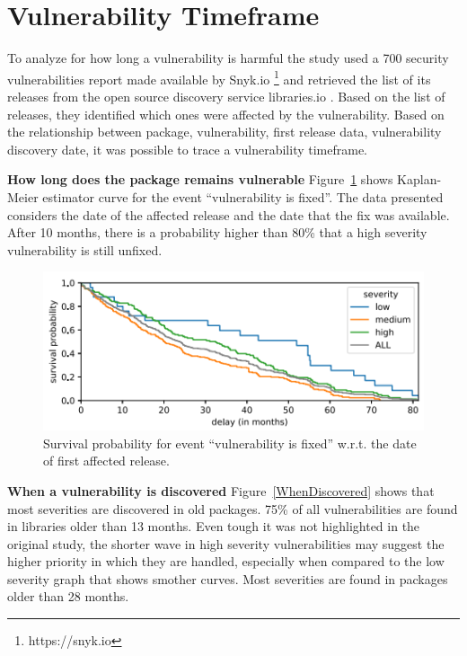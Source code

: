 \documentclass[pdf,bookmarks,colorlinks=true]{IEEEtran}
\begin{document}
\section{Vulnerability Timeframe}
\label{sec:VulnerabilityTimeFrame}


To analyze for how long a vulnerability is harmful the study \cite{Decan2018} used a 700 security vulnerabilities report made available by Snyk.io \footnote{https://snyk.io} and retrieved the list of its releases from the open source discovery service libraries.io \cite{Nesbitt2017}. Based on the list of releases, they identified which ones were affected by the vulnerability.
Based on the relationship between package, vulnerability, first release data, vulnerability discovery date, it was possible to trace a vulnerability timeframe.

\textbf{How long does the package remains vulnerable}
Figure~\ref{RemainsVulnerable} shows Kaplan-Meier estimator  curve \cite{Kaplan1958} for the event “vulnerability is fixed”. The data presented considers the date of the affected release and the date that the fix was available. After 10 months, there is a probability higher than 80\% that a high severity vulnerability is still unfixed.

\begin{figure}[h]
	\centering
	\includegraphics[scale=0.70]{RemainsVulnerable.png}
	\caption{Survival probability for event “vulnerability is fixed” w.r.t. the date of first affected release.}
	\label{RemainsVulnerable}
\end{figure}



\textbf{When a vulnerability is discovered}
Figure~\ref{WhenDiscovered} shows that most severities are discovered in old packages. 75\% of all vulnerabilities are found in libraries older than 13 months. Even tough it was not highlighted in the original study, the shorter wave in high severity vulnerabilities may suggest the higher priority in which they are handled, especially when compared to the low severity graph that shows smother curves. Most severities are found in packages older than 28 months.
\end{document}
